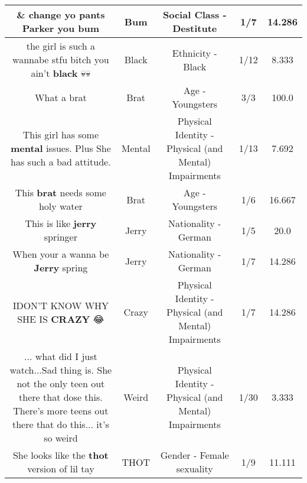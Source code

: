 \documentclass[11pt]{article}
\newlength\mylength
\begin{document}
\begin{center}
\begin{longtable}{|C{.65\mylength}|C{.30\mylength}|C{.12\mylength}|C{.12\mylength}|C{.12\mylength}|}
  \small \& change yo pants Parker you bum\normalsize   & Bum & Social Class - Destitute & 1/7 & 14.286 \\  \hline
  \small the girl is such a wannabe stfu bitch you ain't \textbf{black} 💀💀\normalsize   & Black & Ethnicity - Black & 1/12 & 8.333 \\  \hline
  \small What a brat\normalsize   & Brat & Age - Youngsters & 3/3 & 100.0 \\  \hline
  \small This girl has some \textbf{mental} issues. Plus She has such a bad attitude.\normalsize   & Mental & Physical Identity - Physical (and Mental) Impairments & 1/13 & 7.692 \\  \hline
  \small This \textbf{brat} needs some holy water\normalsize   & Brat & Age - Youngsters & 1/6 & 16.667 \\  \hline
  \small This is like \textbf{jerry} springer\normalsize   & Jerry & Nationality - German & 1/5 & 20.0 \\  \hline
  \small When your a wanna be \textbf{Jerry} spring\normalsize   & Jerry & Nationality - German & 1/7 & 14.286 \\  \hline
  \small IDON'T KNOW WHY SHE IS \textbf{CRAZY} 😂\normalsize   & Crazy & Physical Identity - Physical (and Mental) Impairments & 1/7 & 14.286 \\  \hline
  \small ... what did I just watch...Sad thing is. She not the only teen out there that dose this. There's more teens  out there that do this... it's so weird\normalsize   & Weird & Physical Identity - Physical (and Mental) Impairments & 1/30 & 3.333 \\  \hline
  \small She looks like the \textbf{thot} version of lil tay\normalsize   & THOT & Gender - Female sexuality & 1/9 & 11.111 \\  \hline

\end{longtable}
\end{center}
\end{document}
